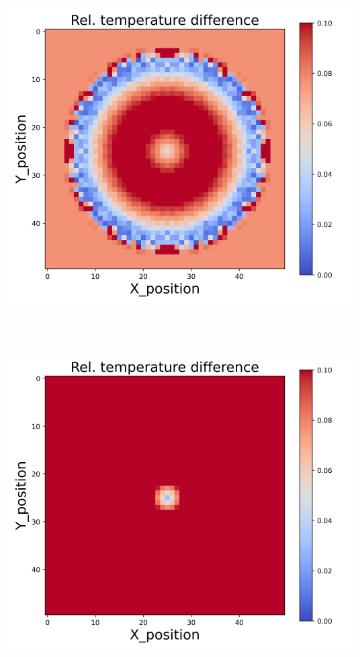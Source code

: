 \begin{figure}[h]
\begin{minipage}{\textwidth}
\begin{subfigure}{0.3\textwidth}
        \end{subfigure}
        \begin{subfigure}{0.3\textwidth}
            \centering
            \includegraphics[width=\textwidth]{figures/raw_data/31/mix/T_bias.jpg}
        \end{subfigure}
    \end{minipage}\\
    \begin{minipage}{\textwidth}
        \centering
        \begin{subfigure}{0.3\textwidth}
            \centering
            \includegraphics[width=\textwidth]{figures/raw_data/32/mix/T_bias.jpg}

\end{subfigure}
\end{minipage}
\end{figure}
